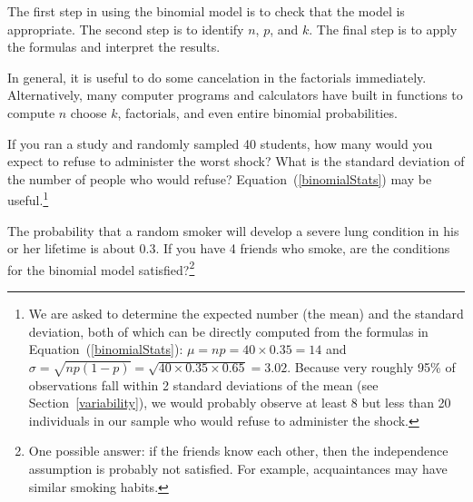 \begin{tipBox}{
The first step in using the binomial model is to check that the model is appropriate. The second step is to identify $n$, $p$, and $k$. The final step is to apply the formulas and interpret the results.}
\end{tipBox}

\begin{tipBox}{
In general, it is useful to do some cancelation in the factorials immediately. Alternatively, many computer programs and calculators have built in functions to compute $n$ choose $k$, factorials, and even entire binomial probabilities.}
\end{tipBox}

\begin{exercise}
If you ran a study and randomly sampled 40 students, how many would you expect to refuse to administer the worst shock? What is the standard deviation of the number of people who would refuse? Equation~(\ref{binomialStats}) may be useful.\footnote{We are asked to determine the expected number (the mean) and the standard deviation, both of which can be directly computed from the formulas in Equation~(\ref{binomialStats}): $\mu=np = 40\times 0.35 = 14$ and $\sigma = \sqrt{np(1-p)} = \sqrt{40\times 0.35\times 0.65} = 3.02$. Because very roughly 95\% of observations fall within 2 standard deviations of the mean (see Section~\ref{variability}), we would probably observe at least 8 but less than 20 individuals in our sample who would refuse to administer the shock.}
\end{exercise}

\begin{exercise}
The probability that a random smoker will develop a severe lung condition in his or her lifetime is about $0.3$. If you have 4 friends who smoke, are the conditions for the binomial model satisfied?\footnote{One possible answer: if the friends know each other, then the independence assumption is probably not satisfied. For example, acquaintances may have similar smoking habits.}
\end{exercise}


